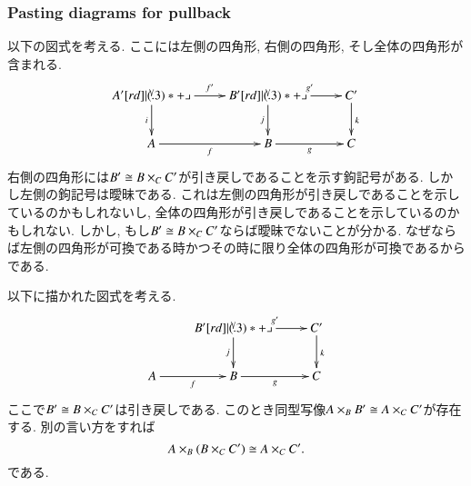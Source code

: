 
\subsubsection{Pasting diagrams for pullback}


以下の図式を考える. ここには左側の四角形, 右側の四角形, そし全体の四角形が含まれる.
$$
\xymatrix{
A'\ar[r]^{f'}\ar[d]_i\ullimit&B'\ar[r]^{g'}\ar[d]_j\ullimit&C'\ar[d]^k\\
A\ar[r]_f&B\ar[r]_g&C}
$$
右側の四角形には$B'\cong B\times_CC'$が引き戻しであることを示す鉤記号がある. しかし左側の鉤記号は曖昧である. これは左側の四角形が引き戻しであることを示しているのかもしれないし, 全体の四角形が引き戻しであることを示しているのかもしれない. しかし, もし$B'\cong B\times_CC'$ならば曖昧でないことが分かる. なぜならば左側の四角形が可換である時かつその時に限り全体の四角形が可換であるからである.

\begin{proposition}\label{prop:pasting}


以下に描かれた図式を考える.
$$
\xymatrix{
&B'\ar[r]^{g'}\ar[d]_j\ullimit&C'\ar[d]^k\\
A\ar[r]_f&B\ar[r]_g&C}
$$
ここで$B'\cong B\times_CC'$は引き戻しである. このとき同型写像$A\times_BB'\cong A\times_CC'$が存在する. 別の言い方をすれば$$A\times_B(B\times_CC')\cong A\times_CC'.$$である.

\end{proposition}

